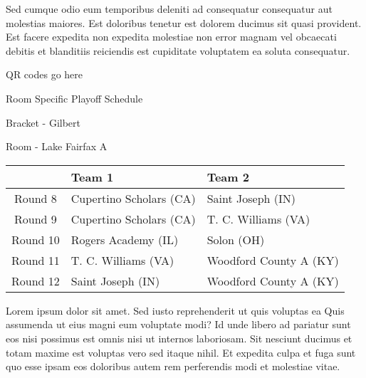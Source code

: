 \documentclass{article}%
\begin{document}
\newline%
Sed cumque odio eum temporibus deleniti ad consequatur consequatur aut molestias maiores. Est doloribus tenetur est dolorem ducimus sit quasi provident. Est facere expedita non expedita molestiae non error magnam vel obcaecati debitis et blanditiis reiciendis est cupiditate voluptatem ea soluta consequatur.%
\vspace*{140pt}%
\begin{center}%
\begin{Huge}%
QR codes go here%
\end{Huge}%
\end{center}%
\newpage%
\begin{center}%
\begin{Huge}%
Room Specific Playoff Schedule%
\end{Huge}%
\vspace*{8pt}%
\linebreak%
\begin{Large}%
Bracket {-} Gilbert%
\end{Large}%
\vspace*{8pt}%
\linebreak%
\vspace*{8pt}%
\begin{Large}%
Room {-} Lake Fairfax A%
\end{Large}%
\end{center}%
%
\begin{tabularx}{\textwidth}{|c|Y|Y|}%
\hline%
&Team 1&Team 2\\%
\hline%
Round 8&Cupertino Scholars (CA)&Saint Joseph (IN)\\%
Round 9&Cupertino Scholars (CA)&T. C. Williams (VA)\\%
Round 10&Rogers Academy (IL)&Solon (OH)\\%
Round 11&T. C. Williams (VA)&Woodford County A (KY)\\%
Round 12&Saint Joseph (IN)&Woodford County A (KY)\\%
\hline%
\end{tabularx}%
\vspace*{8pt}%
\newline%
Lorem ipsum dolor sit amet. Sed iusto reprehenderit ut quis voluptas ea Quis assumenda ut eius magni eum voluptate modi? Id unde libero ad pariatur sunt eos nisi possimus est omnis nisi ut internos laboriosam. Sit nesciunt ducimus et totam maxime est voluptas vero sed itaque nihil. Et expedita culpa et fuga sunt quo esse ipsam eos doloribus autem rem perferendis modi et molestiae vitae.\newline%
\end{document}
